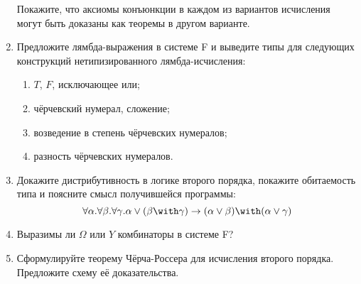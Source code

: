 \documentclass[10pt,a4paper,oneside]{article}
\begin{document}
\begin{enumerate}
Покажите, что аксиомы конъюнкции в каждом из вариантов исчисления могут быть доказаны как теоремы в другом варианте.

\item Предложите лямбда-выражения в системе F и выведите типы для следующих конструкций нетипизированного лямбда-исчисления:
\begin{enumerate}
\item $T$, $F$, исключающее или;
\item чёрчевский нумерал, сложение;
\item возведение в степень чёрчевских нумералов;
\item разность чёрчевских нумералов.
\end{enumerate}

\item Докажите дистрибутивность в логике второго порядка, покажите обитаемость типа и поясните смысл получившейся программы:
$$\forall\alpha.\forall\beta.\forall\gamma.\alpha\vee(\beta\with\gamma)\rightarrow(\alpha\vee\beta)\with(\alpha\vee\gamma)$$

\item Выразимы ли $\Omega$ или $Y$ комбинаторы в системе F?

\item Сформулируйте теорему Чёрча-Россера для исчисления второго порядка. Предложите схему её доказательства.

\end{enumerate}
\end{document}
